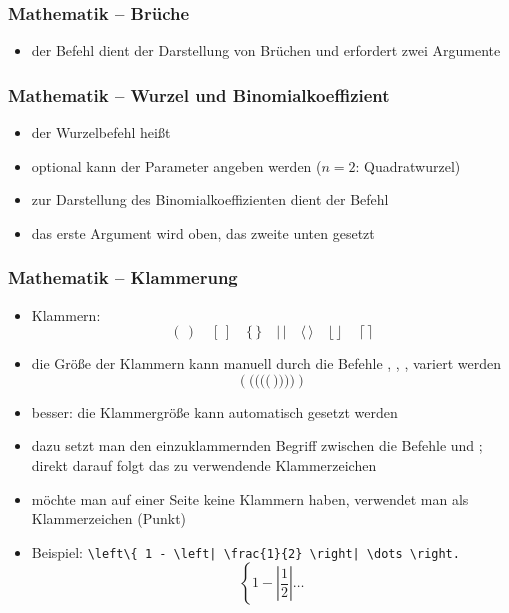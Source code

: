 \begin{frame}[fragile]
	\frametitle{Mathematik -- Brüche}
	\begin{itemize}
		\item der  Befehl dient der Darstellung von Brüchen und erfordert zwei Argumente
	\end{itemize}
	\vfill
\end{frame}

\begin{frame}[fragile]
	\frametitle{Mathematik -- Wurzel und Binomialkoeffizient}
	\begin{itemize}
		\item der Wurzelbefehl heißt 
		\item optional kann der Parameter  angeben werden ($n = 2$:  Quadratwurzel)
	\end{itemize}
	\vfill
	\begin{itemize}
		\item zur Darstellung des Binomialkoeffizienten dient der Befehl 
		\item das erste Argument wird oben, das zweite unten gesetzt
	\end{itemize}
	\vfill
\end{frame}

\begin{frame}[fragile]
	\frametitle{Mathematik -- Klammerung} \vspace{-0.6cm}
	\begin{itemize}
		\item Klammern: \keyword{() [] \{\} ||}   
			\[ (\,) \quad [\,] \quad \{\,\} \quad |\,| \quad \langle \, \rangle \quad \lfloor \, \rfloor \quad \, \lceil \, \rceil \]
		\item die Größe der Klammern kann manuell durch die Befehle , , ,  variert werden
			\[ ( \big( \Big( \bigg( \Bigg( \, \Bigg) \bigg) \Big) \big) ) \]
		\item besser: die Klammergröße kann automatisch gesetzt werden
		\item dazu setzt man den einzuklammernden Begriff zwischen die Befehle  und ; direkt darauf folgt das zu verwendende Klammerzeichen\\
		\item möchte man auf einer Seite keine Klammern haben, verwendet man als Klammerzeichen  (Punkt)
		\item Beispiel: \lstinline$\left\{ 1 - \left| \frac{1}{2} \right| \dots \right.$
		\[
			\left\{ 1 - \left| \frac{1}{2} \right| \dots \right.
		\]
	\end{itemize}
\end{frame}

